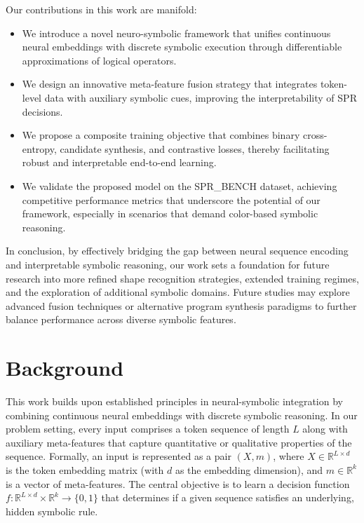 \documentclass[11pt]{article}
\begin{document}
Our contributions in this work are manifold:
\begin{itemize}
    \item We introduce a novel neuro-symbolic framework that unifies continuous neural embeddings with discrete symbolic execution through differentiable approximations of logical operators.
    \item We design an innovative meta-feature fusion strategy that integrates token-level data with auxiliary symbolic cues, improving the interpretability of SPR decisions.
    \item We propose a composite training objective that combines binary cross-entropy, candidate synthesis, and contrastive losses, thereby facilitating robust and interpretable end-to-end learning.
    \item We validate the proposed model on the SPR\_BENCH dataset, achieving competitive performance metrics that underscore the potential of our framework, especially in scenarios that demand color-based symbolic reasoning.
\end{itemize}
In conclusion, by effectively bridging the gap between neural sequence encoding and interpretable symbolic reasoning, our work sets a foundation for future research into more refined shape recognition strategies, extended training regimes, and the exploration of additional symbolic domains. Future studies may explore advanced fusion techniques or alternative program synthesis paradigms to further balance performance across diverse symbolic features.

\section{Background}
This work builds upon established principles in neural-symbolic integration by combining continuous neural embeddings with discrete symbolic reasoning. In our problem setting, every input comprises a token sequence of length \(L\) along with auxiliary meta-features that capture quantitative or qualitative properties of the sequence. Formally, an input is represented as a pair \((X, m)\), where \(X \in \mathbb{R}^{L \times d}\) is the token embedding matrix (with \(d\) as the embedding dimension), and \(m \in \mathbb{R}^{k}\) is a vector of meta-features. The central objective is to learn a decision function \(f: \mathbb{R}^{L \times d} \times \mathbb{R}^{k} \rightarrow \{0,1\}\) that determines if a given sequence satisfies an underlying, hidden symbolic rule.
\end{document}

